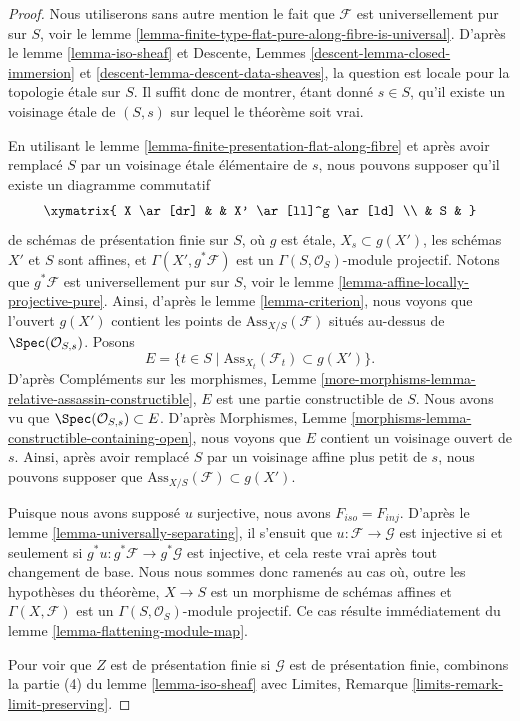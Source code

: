 \begin{proof}
Nous utiliserons sans autre mention le fait que $\mathcal{F}$ est universellement pur
sur $S$, voir
le lemme \ref{lemma-finite-type-flat-pure-along-fibre-is-universal}.
D'après
le lemme \ref{lemma-iso-sheaf}
et
Descente, Lemmes \ref{descent-lemma-closed-immersion} et
\ref{descent-lemma-descent-data-sheaves},
la question est locale pour la topologie étale sur $S$.
Il suffit donc de montrer, étant donné $s \in S$, qu'il existe
un voisinage étale de $(S, s)$ sur lequel le théorème soit vrai.

\medskip\noindent
En utilisant
le lemme \ref{lemma-finite-presentation-flat-along-fibre}
et après avoir remplacé $S$ par un voisinage étale élémentaire de $s$,
nous pouvons supposer qu'il existe un diagramme commutatif
$$
\xymatrix{
X \ar[dr] & & X' \ar[ll]^g \ar[ld] \\
& S &
}
$$
de schémas de présentation finie sur $S$,
où $g$ est étale, $X_s \subset g(X')$, les schémas $X'$ et $S$ sont affines,
et $\Gamma(X', g^*\mathcal{F})$ est un $\Gamma(S, \mathcal{O}_S)$-module projectif.
Notons que $g^*\mathcal{F}$ est universellement pur sur $S$, voir
le lemme \ref{lemma-affine-locally-projective-pure}.
Ainsi, d'après
le lemme \ref{lemma-criterion},
nous voyons que l'ouvert $g(X')$ contient les points de
$\text{Ass}_{X/S}(\mathcal{F})$ situés au-dessus de $\Spec(\mathcal{O}_{S, s})$.
Posons
$$
E = \{t \in S \mid \text{Ass}_{X_t}(\mathcal{F}_t) \subset g(X') \}.
$$
D'après
Compléments sur les morphismes,
Lemme \ref{more-morphisms-lemma-relative-assassin-constructible},
$E$ est une partie constructible de $S$. Nous avons vu que
$\Spec(\mathcal{O}_{S, s}) \subset E$. D'après
Morphismes, Lemme \ref{morphisms-lemma-constructible-containing-open},
nous voyons que $E$ contient un voisinage ouvert de $s$. Ainsi, après avoir
remplacé $S$ par un voisinage affine plus petit de $s$, nous pouvons supposer que
$\text{Ass}_{X/S}(\mathcal{F}) \subset g(X')$.

\medskip\noindent
Puisque nous avons supposé $u$ surjective, nous avons $F_{iso} = F_{inj}$. D'après
le lemme \ref{lemma-universally-separating},
il s'ensuit que $u : \mathcal{F} \to \mathcal{G}$ est injective si et seulement si
$g^*u : g^*\mathcal{F} \to g^*\mathcal{G}$ est injective, et cela reste vrai
après tout changement de base. Nous nous sommes donc ramenés au cas où,
outre les hypothèses du théorème, $X \to S$ est un morphisme de
schémas affines et $\Gamma(X, \mathcal{F})$ est un
$\Gamma(S, \mathcal{O}_S)$-module projectif. Ce cas résulte immédiatement du
lemme \ref{lemma-flattening-module-map}.

\medskip\noindent
Pour voir que $Z$ est de présentation finie si $\mathcal{G}$ est de présentation
finie, combinons la partie (4) du
lemme \ref{lemma-iso-sheaf}
avec
Limites, Remarque \ref{limits-remark-limit-preserving}.
\end{proof}

